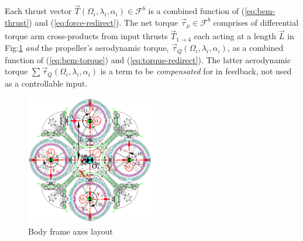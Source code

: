 \documentclass[a4paper, 10pt, conference]{ieeeconf}
\begin{document}
Each thrust vector $\vec{T}(\Omega_i,\lambda_i,\alpha_i)\in\mathcal{F}^b$ is a combined function of (\ref{eq:bem-thrust}) and (\ref{eq:force-redirect}). The net torque $\vec{\tau}_\mu\in\mathcal{F}^b$ comprises of differential torque arm cross-products from input thrusts $\vec{T}_{1\rightarrow 4}$ each acting at a length $\vec{L}$ in Fig:\ref{fig:body-frame} \emph{and} the propeller's aerodynamic torque, $\vec{\tau}_Q(\Omega_i,\lambda_i,\alpha_i)$, as a combined function of (\ref{eq:bem-torque}) and (\ref{eq:torque-redirect}). The latter aerodynamic torque $\sum\vec{\tau}_Q(\Omega_i,\lambda_i,\alpha_i)$ is a term to be \emph{compensated} for in feedback, not used as a controllable input.
\par
\begin{figure}[bp]
\vspace{-15pt}
\centering
\includegraphics[width=0.5\textwidth]{figs/body-frame}
\vspace{-18pt}
\caption{Body frame axes layout}
\label{fig:body-frame}
\end{figure}
\end{document}
